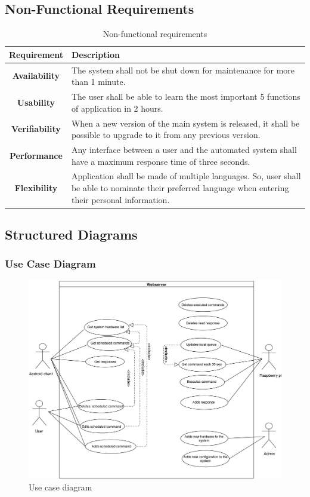 \documentclass[12pt, oneside, a4paper]{book}
\newcommand\boldcolor[1]{\textcolor{bold}{\textbf{#1}}}
\begin{document}
			\newpage\subsection{Non-Functional Requirements}
				\def\arraystretch{1.5}
				\begin{table}[H]
					\caption{Non-functional requirements}
					\begin{center}
						\begin{tabularx}{\linewidth}{|c|X|}\hline
							\boldcolor{Requirement} & \boldcolor{Description}\\\hline
							\textbf{Availability} & The system shall not be shut down for maintenance for more than 1 minute. \\\hline
							\textbf{Usability} & The user shall be able to learn the most important 5 functions of application in 2 hours.  \\\hline
							\textbf{Verifiability} & When a new version of the main system is released, it shall be possible to upgrade to it from any previous version. \\\hline
							\textbf{Performance} & Any interface between a user and the automated system shall have a maximum response time of three seconds. \\\hline
							\textbf{Flexibility} & Application shall be made of multiple languages. So, user shall be able to nominate their preferred language when entering their personal information. \\\hline
						\end{tabularx}
					\end{center}
				\end{table}
			\newpage\subsection{Structured Diagrams}
				\subsubsection{Use Case Diagram}
					\begin{figure}[H]
					\caption{Use case diagram}
					\includegraphics[width=\linewidth]{img/diagram_usecase.jpg}
					\end{figure}
				
\end{document}
